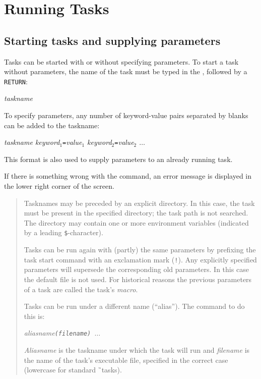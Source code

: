 \section{Running Tasks}
\subsection*{Starting tasks and supplying parameters}
Tasks can be started with or without specifying parameters.
To start a task without parameters, the name of the task must be typed in the
\UCA , followed by a {\tt RETURN}:

{\it taskname}

To specify parameters, any number of keyword-value pairs separated
by blanks can be added to the taskname:

{\it taskname
keyword\/${}_1${\tt =}value\/${}_1$
keyword\/${}_2${\tt =}value\/${}_2$ $\ldots$}

This format is also used to supply parameters to an already running task.

If there is something wrong with the command, an error message is displayed
in the lower right corner of the screen.

\begin{quote}
\small
Tasknames may be preceded by an explicit directory. In this case, the task must
be present in the specified directory; the task path is not searched.
The directory may contain one or more environment variables
(indicated by a leading {\tt \$}-character).

Tasks can be run again with (partly) the same parameters by prefixing the
task start command with an exclamation mark ({\tt !}).
Any explicitly specified parameters will supersede the corresponding old
parameters. In this case the default file is not used.
For historical reasons the previous parameters of a task are called the
task's {\em macro\/}.

Tasks can be run under a different name (``alias''). The command to do this is:

{\it aliasname\tt (\it filename\tt ) $\ldots$}

{\it Aliasname} is the taskname under which the task will run and
{\it filename\/} is the name of the task's executable file, specified in the
correct case (lowercase for standard \G\ tasks).
\end{quote}

